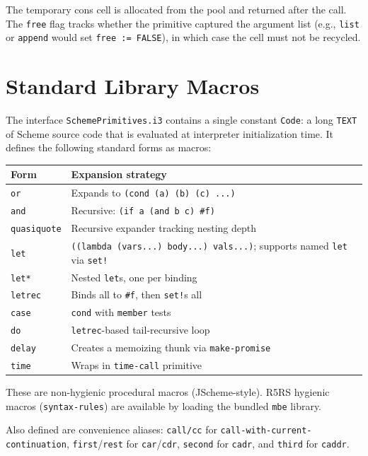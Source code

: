 \documentclass[12pt]{report}
\begin{document}
The temporary cons cell is allocated from the pool and returned after
the call.  The \texttt{free} flag tracks whether the primitive captured
the argument list (e.g., \texttt{list} or \texttt{append} would set
\texttt{free := FALSE}), in which case the cell must not be recycled.

\section{Standard Library Macros}

The interface \texttt{SchemePrimitives.i3} contains a single constant
\texttt{Code}: a long \texttt{TEXT} of Scheme source code that is
evaluated at interpreter initialization time.  It defines the following
standard forms as macros:

\begin{center}
\begin{tabular}{lp{9cm}}
\toprule
\textbf{Form} & \textbf{Expansion strategy} \\
\midrule
\texttt{or} & Expands to \texttt{(cond (a) (b) (c) ...)} \\
\texttt{and} & Recursive: \texttt{(if a (and b c) \#f)} \\
\texttt{quasiquote} & Recursive expander tracking nesting depth \\
\texttt{let} & \texttt{((lambda (vars...) body...) vals...)}; supports named \texttt{let} via \texttt{set!} \\
\texttt{let*} & Nested \texttt{let}s, one per binding \\
\texttt{letrec} & Binds all to \texttt{\#f}, then \texttt{set!}s all \\
\texttt{case} & \texttt{cond} with \texttt{member} tests \\
\texttt{do} & \texttt{letrec}-based tail-recursive loop \\
\texttt{delay} & Creates a memoizing thunk via \texttt{make-promise} \\
\texttt{time} & Wraps in \texttt{time-call} primitive \\
\bottomrule
\end{tabular}
\end{center}

These are non-hygienic procedural macros (JScheme-style).  R5RS
hygienic macros (\texttt{syntax-rules}) are available by loading the
bundled \texttt{mbe} library.

Also defined are convenience aliases:
\texttt{call/cc} for \texttt{call-with-current-continuation},
\texttt{first}/\texttt{rest} for \texttt{car}/\texttt{cdr},
\texttt{second} for \texttt{cadr}, and \texttt{third} for \texttt{caddr}.
\end{document}
